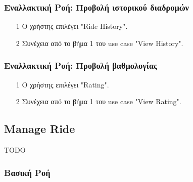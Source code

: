 \subsubsection{Εναλλακτική Ροή: Προβολή ιστορικού διαδρομών}

\begin{enumerate}
    \item[1] Ο χρήστης επιλέγει "Ride History".
    \item[2] Συνέχεια από το βήμα 1 του use case "View History".
\end{enumerate}

\subsubsection{Εναλλακτική Ροή: Προβολή βαθμολογίας}

\begin{enumerate}
    \item[1] Ο χρήστης επιλέγει "Rating".
    \item[2] Συνέχεια από το βήμα 1 του use case "View Rating".
\end{enumerate}

\newpage

\subsection{Manage Ride}

TODO

\subsubsection{Βασική Ροή}

